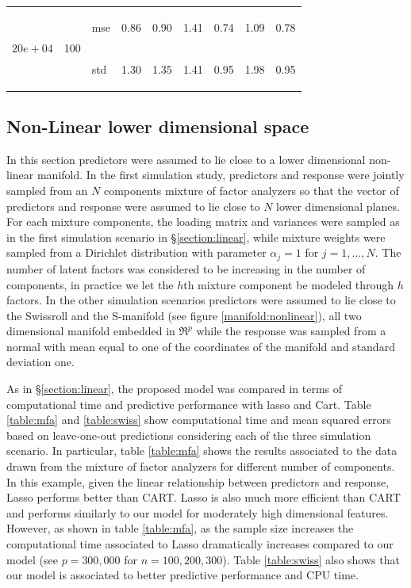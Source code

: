 \documentclass{article} %
\newcommand{\efoo}{\end{footnotesize}}
\newcommand{\bfoo}{\begin{footnotesize}}
\begin{document}
\begin{table}[t]
\begin{center}
\begin{small}
\begin{sc}
\begin{tabular}{lllcccccc}
\multirow{2}{*}{$20e+04$}&\multirow{2}{*}{100}&\bfoo mse\efoo&0.86&0.90&1.41&0.74&1.09&0.78\\
&&\bfoo std\efoo &1.30&1.35&1.41&0.95&1.98&0.95\\
%
\hline
\end{tabular}
\end{sc}
\end{small}
\end{center}
\vskip -0.1in
\end{table}

\subsection{Non-Linear lower dimensional space}

In this section predictors were assumed to lie close to a lower dimensional non-linear manifold. In the first simulation study, predictors and response were jointly sampled from an $N$ components mixture of factor analyzers  so that the vector of predictors and response were assumed to lie close to $N$ lower dimensional planes. For each mixture components, the loading matrix and variances were sampled as in the first simulation scenario in \S \ref{section:linear}, while mixture weights were sampled from a Dirichlet distribution with parameter $\alpha_j=1$ for $j=1, \ldots, N$. The number of latent factors was considered to be increasing in the number of components, in practice we let the $h$th mixture component be modeled through $h$ factors. In the other simulation scenarios predictors were assumed to lie close to the Swissroll and the S-manifold (see figure \ref{manifold:nonlinear}), all two dimensional manifold embedded in $\Re^p$ while the response was sampled from a normal with mean equal to one of the coordinates of the manifold and standard deviation one.

As in \S \ref{section:linear}, the proposed model was compared in terms of computational time and predictive performance with lasso and Cart. Table \ref{table:mfa} and \ref{table:swiss}  show computational time and mean squared errors based on leave-one-out predictions considering each of the three simulation scenario.  In particular, table \ref{table:mfa} shows the results associated to the data drawn from the mixture of factor analyzers for different number of components. In this example, given the linear relationship between predictors and response, Lasso performs better than CART. Lasso is also much more efficient than CART and performs similarly to our model for moderately high dimensional features. However, as shown in table \ref{table:mfa}, as the sample size increases the computational time associated to Lasso dramatically increases compared to our model (see $p=300,000$ for $n=100, 200, 300$). Table \ref{table:swiss} also shows that our model is associated to better predictive performance and CPU time.
\end{document}
